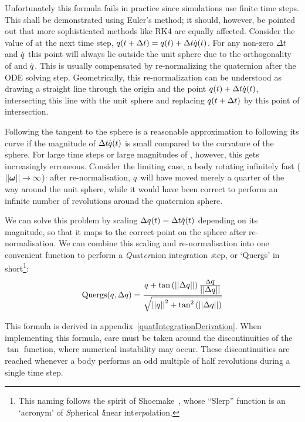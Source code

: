 Unfortunately this formula fails in practice since simulations use finite time steps. This
shall be demonstrated using Euler's method; it should, however, be pointed out that more
sophisticated methods like RK4 are equally affected. Consider the value of  at
the next time step, $\mbox{$q$}(t + \Delta t) = \mbox{$q$}(t) + \Delta t \dot{\mbox{$q$}}(t)$.
For any non-zero $\Delta t$ and $\dot{\mbox{$q$}}$ this point will always lie outside the
unit sphere due to the orthogonality of  and $\dot{\mbox{$q$}}$.
This is usually compensated by re-normalizing the quaternion after the ODE solving step.
Geometrically, this re-normalization can be understood as drawing a straight line through
the origin and the point $\mbox{$q$}(t) + \Delta t \dot{\mbox{$q$}}(t)$,
intersecting this line with the unit sphere and replacing $\mbox{$q$}(t + \Delta t)$ by this
point of intersection.

Following the tangent to the sphere is a reasonable approximation to following its curve if the
magnitude of $\Delta t \dot{\mbox{$q$}}(t)$ is small compared to the curvature of the sphere.
For large time steps or large magnitudes of \ve{\omega}, however, this gets increasingly
erroneous. Consider the limiting case, a body rotating infinitely fast
($\norm{\ve{\omega}} \rightarrow \infty$): after re-normalisation, $\mbox{$q$}$ will have moved merely
a quarter of the way around the unit sphere, while it would have been correct to perform an
infinite number of revolutions around the quaternion sphere.

We can solve this problem by scaling $\Delta\mbox{$q$}(t) = \Delta t \dot{\mbox{$q$}}(t)$
depending on its magnitude, so that it maps to the correct point on the sphere after
re-normalisation. We can combine this scaling and re-normalisation into one convenient
function to perform a {\em Qu}at{\em er}nion inte{\em g}ration {\em s}tep, or `Quergs'
in short\footnote{This naming follows the spirit of Shoemake~\cite{Shoemake:85}, whose
``Slerp'' function is an `acronym' of {\em S}pherical {\em l}inear int{\em erp}olation.}:
\begin{equation}
\label{quergs}
\mathrm{Quergs}(\mbox{$q$}, \Delta\mbox{$q$}) =
    \frac{\mbox{$q$} + \tan\left(\mbox{$||\Delta\mbox{$q$}||$}\right)
        \frac{\Delta\mbox{$q$}}{\mbox{$||\Delta\mbox{$q$}||$}}}{
    \sqrt{\mbox{$||\mbox{$q$}||$}^2 + \tan^2\left(\mbox{$||\Delta\mbox{$q$}||$}\right)}}
\end{equation}

This formula is derived in appendix~\ref{quatIntegrationDerivation}.
When implementing this formula, care must be taken around the
discontinuities of the $\tan$ function, where numerical instability may occur. These
discontinuities are reached whenever a body performs an odd multiple of half
revolutions during a single time step.

